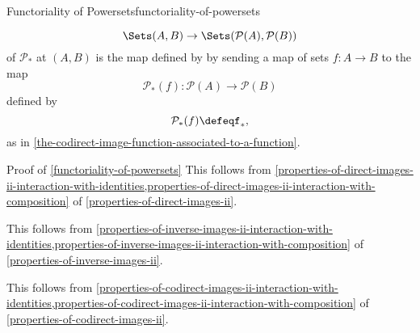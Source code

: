 \begin{proposition}{Functoriality of Powersets}{functoriality-of-powersets}
\begin{enumerate}
\begin{itemize}
\[                        \Sets(A,B)%
                        \to%
                        \Sets(\mathcal{P}(A),\mathcal{P}(B))%
                    \]%
                    of $\mathcal{P}_{*}$ at $(A,B)$ is the map defined by by sending a map of sets $f\colon A\to B$ to the map
                    \[
                        \mathcal{P}_{*}(f)%
                        \colon%
                        \mathcal{P}(A)%
                        \to%
                        \mathcal{P}(B)%
                    \]%
                    defined by
                    \[
                        \mathcal{P}_{*}(f)%
                        \defeq%
                        f_{*},%
                    \]%
                    as in \cref{the-codirect-image-function-associated-to-a-function}.
            \end{itemize}
    \end{enumerate}
\end{proposition}
\begin{Proof}{Proof of \cref{functoriality-of-powersets}}%
    This follows from \cref{properties-of-direct-images-ii-interaction-with-identities,properties-of-direct-images-ii-interaction-with-composition} of \cref{properties-of-direct-images-ii}.

    This follows from \cref{properties-of-inverse-images-ii-interaction-with-identities,properties-of-inverse-images-ii-interaction-with-composition} of \cref{properties-of-inverse-images-ii}.

    This follows from \cref{properties-of-codirect-images-ii-interaction-with-identities,properties-of-codirect-images-ii-interaction-with-composition} of \cref{properties-of-codirect-images-ii}.
\end{Proof}
